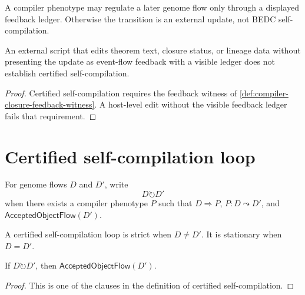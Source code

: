 \begin{principle}
\label{prin:compiler-closure-no-unledgered-feedback}
A compiler phenotype may regulate a later genome flow only through a displayed
feedback ledger. Otherwise the transition is an external update, not BEDC
self-compilation.
\end{principle}

\begin{corollary}
\label{cor:compiler-closure-external-file-edits-not-loop}
An external script that edits theorem text, closure status, or lineage data
without presenting the update as event-flow feedback with a visible ledger does
not establish certified self-compilation.
\end{corollary}
\begin{proof}
Certified self-compilation requires the feedback witness of
\autoref{def:compiler-closure-feedback-witness}. A host-level edit without the
visible feedback ledger fails that requirement.
\end{proof}

\section{Certified self-compilation loop}
\label{sec:compiler-closure-certified-loop}

\begin{definition}
\label{def:compiler-closure-certified-loop}
For genome flows $D$ and $D'$, write
$$
D\circlearrowright D'
$$
when there exists a compiler phenotype $P$ such that $D\Rightarrow P$,
$P:D\leadsto D'$, and $\mathsf{AcceptedObjectFlow}(D')$.
\end{definition}

\begin{definition}
\label{def:compiler-closure-strict-stationary}
A certified self-compilation loop is strict when $D\neq D'$. It is stationary
when $D=D'$.
\end{definition}

\begin{theorem}
\label{thm:compiler-closure-loop-accepted-output}
If $D\circlearrowright D'$, then $\mathsf{AcceptedObjectFlow}(D')$.
\end{theorem}
\begin{proof}
This is one of the clauses in the definition of certified self-compilation.
\end{proof}

